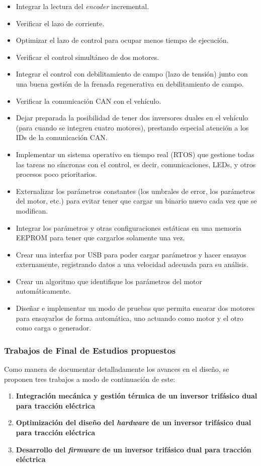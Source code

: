 \begin{itemize}
	\item Integrar la lectura del \textit{encoder} incremental.
	\item Verificar el lazo de corriente.
	\item Optimizar el lazo de control para ocupar menos tiempo de ejecución.
	\item Verificar el control simultáneo de dos motores.
	\item Integrar el control con debilitamiento de campo (lazo de tensión) junto con una buena gestión de la frenada regenerativa en debilitamiento de campo.
	\item Verificar la comunicación CAN con el vehículo.
	\item Dejar preparada la posibilidad de tener dos inversores duales en el vehículo (para cuando se integren cuatro motores), prestando especial atención a los IDs de la comunicación CAN.
	\item Implementar un sistema operativo en tiempo real (RTOS) que gestione todas las tareas no síncronas con el control, es decir, comunicaciones, LEDs, y otros procesos poco prioritarios.
	\item Externalizar los parámetros constantes (los umbrales de error, los parámetros del motor, etc.) para evitar tener que cargar un binario nuevo cada vez que se modifican.
	\item Integrar los parámetros y otras configuraciones estáticas en una memoria EEPROM para tener que cargarlos solamente una vez.
	\item Crear una interfaz por USB para poder cargar parámetros y hacer ensayos externamente, registrando datos a una velocidad adecuada para su análisis.
	\item Crear un algoritmo que identifique los parámetros del motor automáticamente.
	\item Diseñar e implementar un modo de pruebas que permita encarar dos motores para ensayarlos de forma automática, uno actuando como motor y el otro como carga o generador.
\end{itemize}


\subsubsection*{Trabajos de Final de Estudios propuestos}

Como manera de documentar detalladamente los avances en el diseño, se proponen tres trabajos a modo de continuación de este:

\begin{enumerate}
	
	\item \textbf{Integración mecánica y gestión térmica de un inversor trifásico dual para tracción eléctrica}
	\item \textbf{Optimización del diseño del \textit{hardware} de un inversor trifásico dual para tracción eléctrica}
	\item \textbf{Desarrollo del \textit{firmware} de un inversor trifásico dual para tracción eléctrica}

\end{enumerate}
